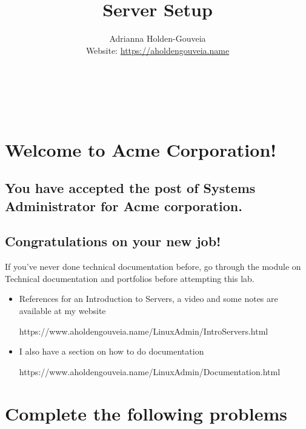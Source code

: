 \documentclass[12pt]{article}
\title{Server Setup}
\author{
        Adrianna Holden-Gouveia \\
        Website: \url{https://aholdengouveia.name}\\ 
        \date{\vspace{-5ex}}
        \faLinkedin{: aholdengouveia} \\
        \faGithub {: aholdengouveia} \\
        \faTwitter {: aholdengouveia} \\
        }
\begin{document}
    

\maketitle


\section*{Welcome to Acme Corporation!}
\subsection*{You have accepted the post of Systems Administrator for Acme corporation.} 
\subsection*{Congratulations on your new job!}

If you've never done technical documentation before, go through the module on Technical documentation and portfolios before attempting this lab.

    \begin{itemize}
\item References for an Introduction to Servers, a video and some notes are available at my website

https://www.aholdengouveia.name/LinuxAdmin/IntroServers.html 


\item I also have a section on how to do documentation 

https://www.aholdengouveia.name/LinuxAdmin/Documentation.html


\end{itemize}

\section*{Complete the following problems}
\end{document}
